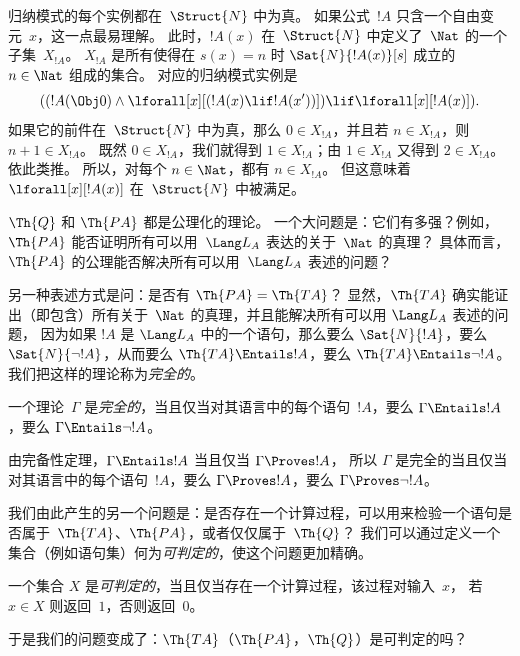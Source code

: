 \documentclass[../../../include/open-logic-section]{subfiles}
\begin{document}
\begin{explain}
归纳模式的每个实例都在~$\Struct{N}$ 中为真。
如果公式~$!A$ 只含一个自由变元~$x$，这一点最易理解。
此时，$!A(x)$ 在~$\Struct{N}$ 中定义了~$\Nat$ 的一个子集~$X_{!A}$。
$X_{!A}$ 是所有使得在 $s(x) = n$ 时 $\Sat{N}{!A(x)}[s]$ 成立的~$n \in \Nat$ 组成的集合。
对应的归纳模式实例是
\[
((!A(\Obj 0) \land \lforall[x][(!A(x) \lif !A(x'))]) \lif
  \lforall[x][!A(x)]).
\]
如果它的前件在~$\Struct{N}$ 中为真，那么 $0 \in X_{!A}$，并且若 $n \in X_{!A}$，则 $n+1 \in X_{!A}$。
既然 $0 \in X_{!A}$，我们就得到 $1 \in X_{!A}$；由 $1 \in X_{!A}$ 又得到 $2 \in X_{!A}$。依此类推。
所以，对每个 $n \in \Nat$，都有 $n \in X_{!A}$。
但这意味着 $\lforall[x][!A(x)]$ 在~$\Struct{N}$ 中被满足。
\end{explain}

$\Th{Q}$ 和 $\Th{PA}$ 都是公理化的理论。
一个大问题是：它们有多强？例如，$\Th{PA}$ 能否证明所有可以用~$\Lang L_A$ 表达的关于~$\Nat$ 的真理？
具体而言，$\Th{PA}$ 的公理能否解决所有可以用~$\Lang L_A$ 表述的问题？

另一种表述方式是问：是否有 $\Th{PA} = \Th{TA}$？
显然，$\Th{TA}$ 确实能证出（即包含）所有关于~$\Nat$ 的真理，并且能解决所有可以用 $\Lang L_A$ 表述的问题，
因为如果 $!A$ 是 $\Lang L_A$ 中的一个语句，那么要么 $\Sat{N}{!A}$，要么 $\Sat{N}{\lnot !A}$，从而要么 $\Th{TA} \Entails !A$，要么 $\Th{TA} \Entails \lnot !A$。
我们把这样的理论称为\emph{完全的}。

\begin{defn}
一个理论~$\Gamma$ 是\emph{完全的}，当且仅当对其语言中的每个语句~$!A$，要么 $\Gamma \Entails !A$，要么 $\Gamma \Entails \lnot !A$。
\end{defn}

\begin{explain}
由完备性定理，$\Gamma \Entails !A$ 当且仅当 $\Gamma \Proves !A$，
所以 $\Gamma$ 是完全的当且仅当对其语言中的每个语句~$!A$，要么 $\Gamma \Proves !A$，要么 $\Gamma \Proves \lnot !A$。
\end{explain}

我们由此产生的另一个问题是：是否存在一个计算过程，可以用来检验一个语句是否属于~$\Th{TA}$、$\Th{PA}$，或者仅仅属于~$\Th{Q}$？
我们可以通过定义一个集合（例如语句集）何为\emph{可判定的}，使这个问题更加精确。

\begin{defn}
一个集合 $X$ 是\emph{可判定的}，当且仅当存在一个计算过程，该过程对输入~$x$，
若 $x \in X$ 则返回~$1$，否则返回~$0$。
\end{defn}

于是我们的问题变成了：$\Th{TA}$（$\Th{PA}$，$\Th{Q}$）是可判定的吗？
\end{document}
